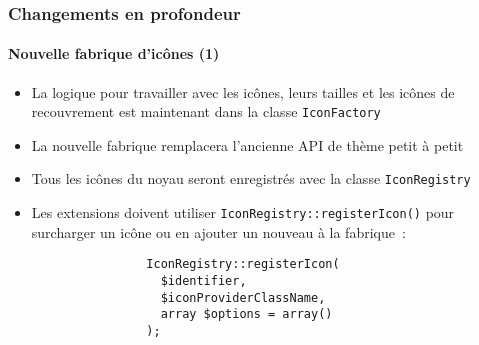 \begin{frame}[fragile]
	\frametitle{Changements en profondeur}
	\framesubtitle{Nouvelle fabrique d'icônes (1)}

	\lstset{basicstyle=\smaller\ttfamily}

	\begin{itemize}

		\item La logique pour travailler avec les icônes, leurs tailles et
			les icônes de recouvrement est maintenant dans la classe \texttt{IconFactory}

		\item La nouvelle fabrique remplacera l'ancienne API de thème petit à petit

		\item Tous les icônes du noyau seront enregistrés avec la classe \texttt{IconRegistry}

		\item Les extensions doivent utiliser \texttt{IconRegistry::registerIcon()} pour surcharger un icône
			ou en ajouter un nouveau à la fabrique~:

			\begin{lstlisting}
				IconRegistry::registerIcon(
				  $identifier,
				  $iconProviderClassName,
				  array $options = array()
				);
			\end{lstlisting}

	\end{itemize}

\end{frame}


